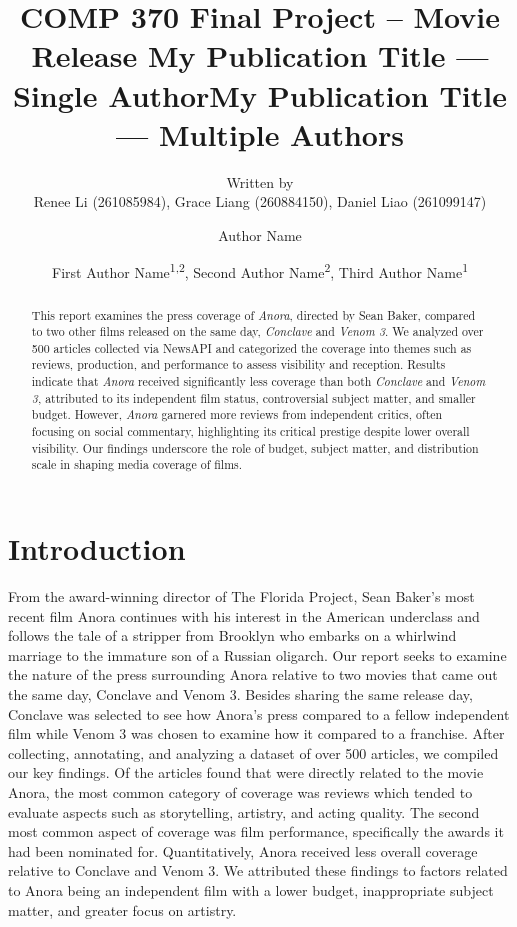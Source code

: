 \documentclass[letterpaper]{article} %
\title{COMP 370 Final Project -- Movie Release }
\author{
    Written by \\ Renee Li (261085984), Grace Liang (260884150), Daniel Liao (261099147)
}
\title{My Publication Title --- Single Author}
\author {
    Author Name
}
\title{My Publication Title --- Multiple Authors}
\author {
    First Author Name\textsuperscript{\rm 1,\rm 2},
    Second Author Name\textsuperscript{\rm 2},
    Third Author Name\textsuperscript{\rm 1}
}
\begin{document}
\maketitle

\begin{abstract}
This report examines the press coverage of \textit{Anora}, directed by Sean Baker, compared to two other films released on the same day, \textit{Conclave} and \textit{Venom 3}. We analyzed over 500 articles collected via NewsAPI and categorized the coverage into themes such as reviews, production, and performance to assess visibility and reception. Results indicate that \textit{Anora} received significantly less coverage than both \textit{Conclave} and \textit{Venom 3}, attributed to its independent film status, controversial subject matter, and smaller budget. However, \textit{Anora} garnered more reviews from independent critics, often focusing on social commentary, highlighting its critical prestige despite lower overall visibility. Our findings underscore the role of budget, subject matter, and distribution scale in shaping media coverage of films.
\end{abstract}

\section{Introduction}

From the award-winning director of The Florida Project, Sean Baker’s most recent film Anora continues with his interest in the American underclass and follows the tale of a stripper from Brooklyn who embarks on a whirlwind marriage to the immature son of a Russian oligarch. Our report seeks to examine the nature of the press surrounding Anora relative to two movies that came out the same day, Conclave and Venom 3. Besides sharing the same release day, Conclave was selected to see how Anora’s press compared to a fellow independent film while Venom 3 was chosen to examine how it compared to a franchise.  
After collecting, annotating, and analyzing a dataset of over 500 articles, we compiled our key findings. Of the articles found that were directly related to the movie Anora, the most common category of coverage was reviews which tended to evaluate aspects such as storytelling, artistry, and acting quality. The second most common aspect of coverage was film performance, specifically the awards it had been nominated for. Quantitatively, Anora received less overall coverage relative to Conclave and Venom 3. We attributed these findings to factors related to Anora being an independent film with a lower budget, inappropriate subject matter, and greater focus on artistry. 
\end{document}
